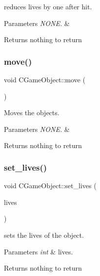reduces lives by one after hit. 


\begin{DoxyParams}{Parameters}
{\em N\+O\+N\+E.} & \\
\hline
\end{DoxyParams}
\begin{DoxyReturn}{Returns}
nothing to return 
\end{DoxyReturn}
\hypertarget{class_c_game_object_a5fecb17a62f57564f27a5e1120721e12}{}\label{class_c_game_object_a5fecb17a62f57564f27a5e1120721e12} 
\subsubsection{\texorpdfstring{move()}{move()}}
{\footnotesize\ttfamily void C\+Game\+Object\+::move (\begin{DoxyParamCaption}{ }\end{DoxyParamCaption})}



Moves the objects. 


\begin{DoxyParams}{Parameters}
{\em N\+O\+N\+E.} & \\
\hline
\end{DoxyParams}
\begin{DoxyReturn}{Returns}
nothing to return 
\end{DoxyReturn}
\hypertarget{class_c_game_object_a1fbab5676bc0491dd10266bce54ad577}{}\label{class_c_game_object_a1fbab5676bc0491dd10266bce54ad577} 
\subsubsection{\texorpdfstring{set\+\_\+lives()}{set\_lives()}}
{\footnotesize\ttfamily void C\+Game\+Object\+::set\+\_\+lives (\begin{DoxyParamCaption}\item[{int}]{lives }\end{DoxyParamCaption})\hspace{0.3cm}{\ttfamily [inline]}}



sets the lives of the object. 


\begin{DoxyParams}{Parameters}
{\em int} & lives. \\
\hline
\end{DoxyParams}
\begin{DoxyReturn}{Returns}
nothing to return 
\end{DoxyReturn}
\hypertarget{class_c_game_object_a30b40c39c694e618e77b7c74fbd490cd}{}\label{class_c_game_object_a30b40c39c694e618e77b7c74fbd490cd} 
